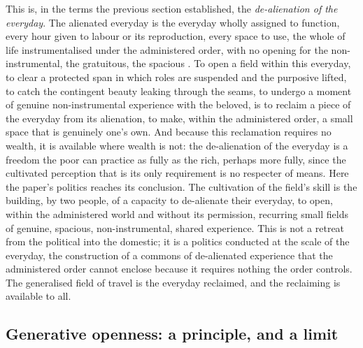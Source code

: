 This is, in the terms the previous section established, the \emph{de-alienation of the everyday}. The alienated everyday is the everyday wholly assigned to function, every hour given to labour or its reproduction, every space to use, the whole of life instrumentalised under the administered order, with no opening for the non-instrumental, the gratuitous, the spacious \parencite{marx1992,debord1994}. To open a field within this everyday, to clear a protected span in which roles are suspended and the purposive lifted, to catch the contingent beauty leaking through the seams, to undergo a moment of genuine non-instrumental experience with the beloved, is to reclaim a piece of the everyday from its alienation, to make, within the administered order, a small space that is genuinely one's own. And because this reclamation requires no wealth, it is available where wealth is not: the de-alienation of the everyday is a freedom the poor can practice as fully as the rich, perhaps more fully, since the cultivated perception that is its only requirement is no respecter of means. Here the paper's politics reaches its conclusion. The cultivation of the field's skill is the building, by two people, of a capacity to de-alienate their everyday, to open, within the administered world and without its permission, recurring small fields of genuine, spacious, non-instrumental, shared experience. This is not a retreat from the political into the domestic; it is a politics conducted at the scale of the everyday, the construction of a commons of de-alienated experience that the administered order cannot enclose because it requires nothing the order controls. The generalised field of travel is the everyday reclaimed, and the reclaiming is available to all.

\subsection{Generative openness: a principle, and a limit}
\label{p21:sub:gen-openness}

